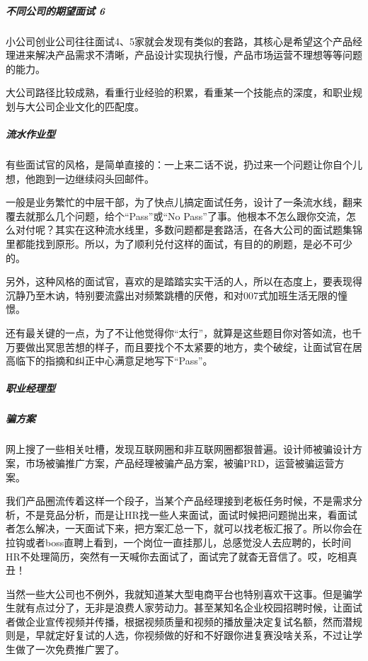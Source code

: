 \documentclass[letterpaper,10pt,english]{sphinxmanual}
\begin{document}
\subparagraph{不同公司的期望面试 6\sphinxfootnotemark[855]}
\label{\detokenize{chapter_interview/interviewer:id4}}%
\begin{footnotetext}[855]\sphinxAtStartFootnote
{}
%
\end{footnotetext}\ignorespaces 
小公司创业公司往往面试4、5家就会发现有类似的套路，其核心是希望这个产品经理进来解决产品需求不清晰，产品设计实现执行慢，产品市场运营不理想等等问题的能力。

大公司路径比较成熟，看重行业经验的积累，看重某一个技能点的深度，和职业规划与大公司企业文化的匹配度。


\subparagraph{流水作业型}
\label{\detokenize{chapter_interview/interviewer:id5}}
有些面试官的风格，是简单直接的：一上来二话不说，扔过来一个问题让你自个儿想，他跑到一边继续闷头回邮件。

一般是业务繁忙的中层干部，为了快点儿搞定面试任务，设计了一条流水线，翻来覆去就那么几个问题，给个“Pass”或“No
Pass”了事。他根本不怎么跟你交流，怎么对付呢？其实在这种流水线里，多数问题都是套路活，在各大公司的面试题集锦里都能找到原形。所以，为了顺利兑付这样的面试，有目的的刷题，是必不可少的。

另外，这种风格的面试官，喜欢的是踏踏实实干活的人，所以在态度上，要表现得沉静乃至木讷，特别要流露出对频繁跳槽的厌倦，和对007式加班生活无限的憧憬。

还有最关键的一点，为了不让他觉得你“太行”，就算是这些题目你对答如流，也千万要做出冥思苦想的样子，而且要找个不太紧要的地方，卖个破绽，让面试官在居高临下的指摘和纠正中心满意足地写下“Pass”。


\subparagraph{职业经理型}
\label{\detokenize{chapter_interview/interviewer:id6}}

\subparagraph{骗方案}
\label{\detokenize{chapter_interview/interviewer:id7}}
网上搜了一些相关吐槽，发现互联网圈和非互联网圈都狠普遍。设计师被骗设计方案，市场被骗推广方案，产品经理被骗产品方案，被骗PRD，运营被骗运营方案。

我们产品圈流传着这样一个段子，当某个产品经理接到老板任务时候，不是需求分析，不是竞品分析，而是让HR找一些人来面试，面试时候把问题抛出来，看面试者怎么解决，一天面试下来，把方案汇总一下，就可以找老板汇报了。所以你会在拉钩或者boss直聘上看到，一个岗位一直挂那儿，总感觉没人去应聘的，长时间HR不处理简历，突然有一天喊你去面试了，面试完了就杳无音信了。哎，吃相真丑！

当然一些大公司也不例外，我就知道某大型电商平台也特别喜欢干这事。但是骗学生就有点过分了，无非是浪费人家劳动力。甚至某知名企业校园招聘时候，让面试者做企业宣传视频并传播，根据视频质量和视频的播放量决定复试名额，然而潜规则是，早就定好复试的人选，你视频做的好和不好跟你进复赛没啥关系，不过让学生做了一次免费推广罢了。
\end{document}
